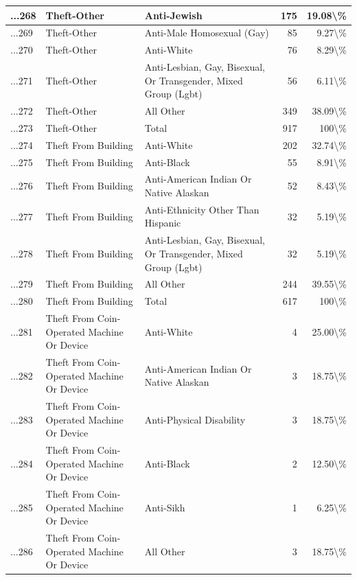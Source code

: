 \documentclass[
]{krantz}
\begin{document}
\begin{longtable}[t]{l|l|l|r|r}
\hline
...268 & Theft-Other & Anti-Jewish & 175 & 19.08\textbackslash{}\%\\
\hline
...269 & Theft-Other & Anti-Male Homosexual (Gay) & 85 & 9.27\textbackslash{}\%\\
\hline
...270 & Theft-Other & Anti-White & 76 & 8.29\textbackslash{}\%\\
\hline
...271 & Theft-Other & Anti-Lesbian, Gay, Bisexual, Or Transgender, Mixed Group (Lgbt) & 56 & 6.11\textbackslash{}\%\\
\hline
...272 & Theft-Other & All Other & 349 & 38.09\textbackslash{}\%\\
\hline
...273 & Theft-Other & Total & 917 & 100\textbackslash{}\%\\
\hline
...274 & Theft From Building & Anti-White & 202 & 32.74\textbackslash{}\%\\
\hline
...275 & Theft From Building & Anti-Black & 55 & 8.91\textbackslash{}\%\\
\hline
...276 & Theft From Building & Anti-American Indian Or Native Alaskan & 52 & 8.43\textbackslash{}\%\\
\hline
...277 & Theft From Building & Anti-Ethnicity Other Than Hispanic & 32 & 5.19\textbackslash{}\%\\
\hline
...278 & Theft From Building & Anti-Lesbian, Gay, Bisexual, Or Transgender, Mixed Group (Lgbt) & 32 & 5.19\textbackslash{}\%\\
\hline
...279 & Theft From Building & All Other & 244 & 39.55\textbackslash{}\%\\
\hline
...280 & Theft From Building & Total & 617 & 100\textbackslash{}\%\\
\hline
...281 & Theft From Coin-Operated Machine Or Device & Anti-White & 4 & 25.00\textbackslash{}\%\\
\hline
...282 & Theft From Coin-Operated Machine Or Device & Anti-American Indian Or Native Alaskan & 3 & 18.75\textbackslash{}\%\\
\hline
...283 & Theft From Coin-Operated Machine Or Device & Anti-Physical Disability & 3 & 18.75\textbackslash{}\%\\
\hline
...284 & Theft From Coin-Operated Machine Or Device & Anti-Black & 2 & 12.50\textbackslash{}\%\\
\hline
...285 & Theft From Coin-Operated Machine Or Device & Anti-Sikh & 1 & 6.25\textbackslash{}\%\\
\hline
...286 & Theft From Coin-Operated Machine Or Device & All Other & 3 & 18.75\textbackslash{}\%\\
\hline

\end{longtable}
\end{document}
